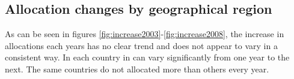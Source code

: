 \subsection{Allocation changes by geographical region}

As can be seen in figures \ref{fig:increase2003}-\ref{fig:increase2008}, the
increase in allocations each years has no clear trend and does not appear to
vary in a consistent way. In each country in can vary significantly from one
year to the next. The same countries do not allocated more than others every
year.
